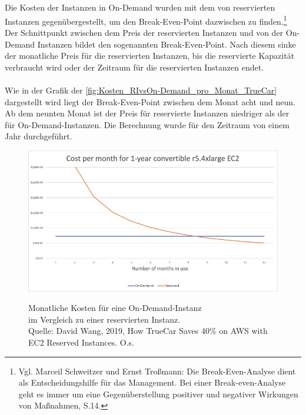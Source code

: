 \\\\
Die Kosten der Instanzen in On-Demand wurden mit dem von reservierten Instanzen gegenübergestellt, um den Break-Even-Point dazwischen zu finden.\footnote{Vgl. Marceil Schweitzer und Ernst Troßmann: Die Break-Even-Analyse dient als Entscheidungshilfe für das Management. Bei einer Break-even-Analyse geht es immer um eine Gegenüberstellung positiver und negativer Wirkungen von Maßnahmen, S.14.\cite{BEA}} Der Schnittpunkt zwischen dem Preis der reservierten Instanzen und von der On-Demand Instanzen bildet den sogenannten Break-Even-Point.
Nach diesem sinke der monatliche Preis für die reservierten Instanzen, bis die reservierte Kapazität verbraucht wird oder der Zeitraum für die reservierten Instanzen endet.
\\\\
Wie in der Grafik der \autoref{fig:Kosten_RIvsOn-Demand_pro_Monat_TrueCar} dargestellt wird liegt der Break-Even-Point zwischen dem Monat acht und neun. Ab dem neunten Monat ist der Preis für reservierte Instanzen niedriger als der für On-Demand-Instanzen. Die Berechnung wurde für den Zeitraum von einem Jahr durchgeführt. %
\begin{figure}[h!]
  \centering
  \includegraphics[scale=0.6]{sources/Kosten_RIvsOn-Demand_pro_Monat_TrueCar}\label{fig:Kosten_RIvsOn-Demand_pro_Monat_TrueCar}\\
  \caption[Monatliche Kosten für eine On-Demand-Instanz im Vergleich zu einer reservierten Instanz]{}
  \label{fig:Kosten_RIvsOn-Demand_pro_Monat_TrueCar}Monatliche Kosten für eine On-Demand-Instanz\\ im Vergleich zu einer reservierten Instanz.\\
  Quelle: David Wang, 2019, How TrueCar Saves 40\% on AWS with EC2 Reserved Instances. O.s.\cite{MED1}
\end{figure}
